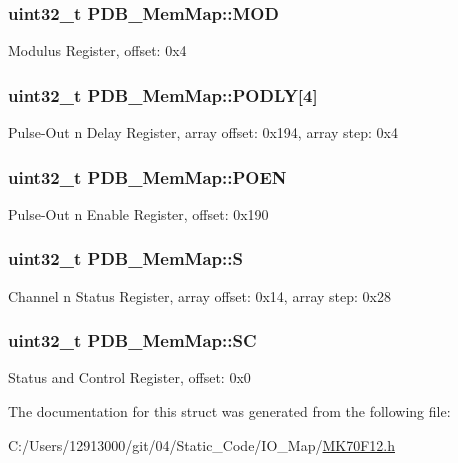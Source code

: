\subsubsection[{M\+O\+D}]{\setlength{\rightskip}{0pt plus 5cm}uint32\+\_\+t P\+D\+B\+\_\+\+Mem\+Map\+::\+M\+O\+D}\label{struct_p_d_b___mem_map_a01bd648b1caa9b6626636fce386b496d}
Modulus Register, offset\+: 0x4 \hypertarget{struct_p_d_b___mem_map_a69081c41b606ea7a699a67e266a785d5}{}
\subsubsection[{P\+O\+D\+L\+Y}]{\setlength{\rightskip}{0pt plus 5cm}uint32\+\_\+t P\+D\+B\+\_\+\+Mem\+Map\+::\+P\+O\+D\+L\+Y\mbox{[}4\mbox{]}}\label{struct_p_d_b___mem_map_a69081c41b606ea7a699a67e266a785d5}
Pulse-\/\+Out n Delay Register, array offset\+: 0x194, array step\+: 0x4 \hypertarget{struct_p_d_b___mem_map_a259dc7b16cc8f12022cb6a5befb1660c}{}
\subsubsection[{P\+O\+E\+N}]{\setlength{\rightskip}{0pt plus 5cm}uint32\+\_\+t P\+D\+B\+\_\+\+Mem\+Map\+::\+P\+O\+E\+N}\label{struct_p_d_b___mem_map_a259dc7b16cc8f12022cb6a5befb1660c}
Pulse-\/\+Out n Enable Register, offset\+: 0x190 \hypertarget{struct_p_d_b___mem_map_afbd33089148cbb97dedff82c1c91c46d}{}
\subsubsection[{S}]{\setlength{\rightskip}{0pt plus 5cm}uint32\+\_\+t P\+D\+B\+\_\+\+Mem\+Map\+::\+S}\label{struct_p_d_b___mem_map_afbd33089148cbb97dedff82c1c91c46d}
Channel n Status Register, array offset\+: 0x14, array step\+: 0x28 \hypertarget{struct_p_d_b___mem_map_a10fb0324a394cc747b6f7d8b4c811b57}{}
\subsubsection[{S\+C}]{\setlength{\rightskip}{0pt plus 5cm}uint32\+\_\+t P\+D\+B\+\_\+\+Mem\+Map\+::\+S\+C}\label{struct_p_d_b___mem_map_a10fb0324a394cc747b6f7d8b4c811b57}
Status and Control Register, offset\+: 0x0 

The documentation for this struct was generated from the following file\+:\begin{DoxyCompactItemize}
\item 
C\+:/\+Users/12913000/git/04/\+Static\+\_\+\+Code/\+I\+O\+\_\+\+Map/\hyperlink{_m_k70_f12_8h}{M\+K70\+F12.\+h}\end{DoxyCompactItemize}
